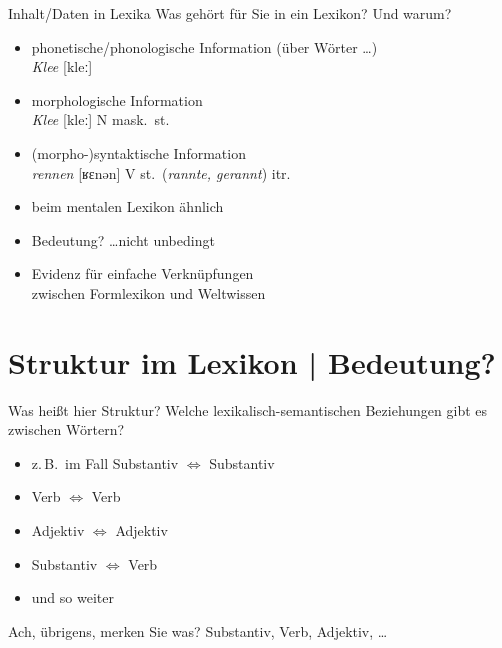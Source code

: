 \begin{frame}
  {Inhalt\slash Daten in Lexika}
  \onslide<+->
  Was gehört für Sie in ein Lexikon? Und warum?\\
  \Zeile
  \onslide<+->
  \onslide<+->
  \begin{itemize}[<+->]
    \item phonetische\slash phonologische Information (über Wörter \ldots)\\
      \Viertelzeile
      \textit{Klee} \alert{[kleː]}
    \item morphologische Information\\
      \Viertelzeile
      \textit{Klee} [kleː] \alert{N mask.\ st.}
    \item (morpho-)syntaktische Information\\
      \Viertelzeile
      \textit{rennen} [ʁɛnən] V st.\ (\textit{rannte, gerannt}) \alert{itr.}
      \Halbzeile
    \item beim mentalen Lexikon ähnlich
      \Halbzeile
    \item \alert{Bedeutung?} \ldots nicht unbedingt \citep{Elman2009}
    \item Evidenz für einfache Verknüpfungen\\
      zwischen \alert{Formlexikon} und \alert{Weltwissen}
  \end{itemize}
\end{frame}

\section{Struktur im Lexikon | Bedeutung?}

\begin{frame}
  {Was heißt hier Struktur?}
  \onslide<+->
  Welche \alert{lexikalisch-semantischen Beziehungen} gibt es zwischen Wörtern?\\
  \onslide<+->
  \onslide<+->
  \Halbzeile
  \begin{itemize}[<+->]
    \item z.\,B.\ im Fall Substantiv $\Leftrightarrow$ Substantiv
    \item Verb $\Leftrightarrow$ Verb
    \item Adjektiv $\Leftrightarrow$ Adjektiv
    \item Substantiv $\Leftrightarrow$ Verb
    \item und so weiter
  \end{itemize}
  \onslide<+->
  \Zeile
  Ach, übrigens, merken Sie was? \onslide<+-> \alert{Substantiv, Verb, Adjektiv, \ldots}
\end{frame}

